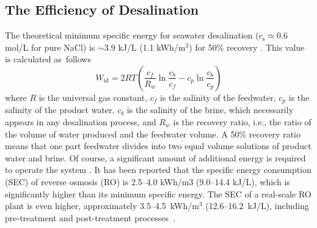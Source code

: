 \documentclass[gels,article,accept,pdftex,moreauthors]{Definitions/mdpi}
\newcommand{\ie}{{i.e.,} }
\newcommand{\cs}{c_{\mathrm{s}}}
\begin{document}
\subsection{The Efficiency of Desalination}
The theoretical minimum specific energy for seawater desalination ($\cs\simeq0.6$ mol/L for pure NaCl) is $\sim$$3.9$ kJ/L (1.1 kWh/m$^3$) for 50\% recovery \cite{Wang_2020}.
This value is calculated as~follows
\begin{equation}
W_{\mathrm{id}}=2RT\left(\frac{c_{f}}{R_{w}}\ln\frac{c_{b}}{c_{f}}-c_{p}\ln\frac{c_{b}}{c_{p}}\right)
\label{eq:SEC}
\end{equation}
where $R$ is the universal gas constant, $c_{f}$ is the salinity of the feedwater, $c_p$ is the salinity of the product water, $c_b$ is the salinity of the brine, which necessarily appears in any desalination process, and
$R_{w}$ is the recovery ratio, \ie the ratio of the volume of water produced and the feedwater volume. A 50\% recovery ratio means that one part feedwater divides into two equal volume solutions of product water and brine.
Of course, a significant amount of additional energy is required to operate the system \cite{Kim_2019}.
It has been reported that the specific energy consumption (SEC) of reverse osmosis (RO) is 2.5--4.0 kWh/m3 (9.0--14.4 kJ/L), which is significantly higher than its minimum specific energy.
The SEC of a real-scale RO plant is even higher, approximately 3.5--4.5~kWh/m$^{3}$ (12.6--16.2~kJ/L), including pre-treatment and post-treatment processes~\cite{Kim_2018}.
\end{document}

